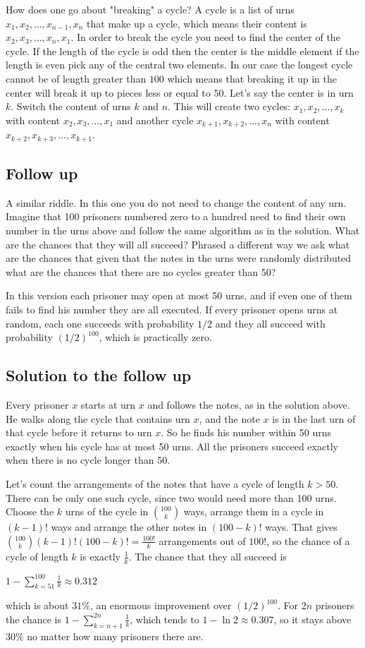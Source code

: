 How does one go about "breaking" a cycle? A cycle is a list of urns $x_1, x_2, \ldots,x_{n-1} ,x_n$ that make up a cycle, which means their content is $x_2, x_3, \ldots, x_n, x_1$. In order to break the cycle you need to find the center of the cycle. If the length of the cycle is odd then the center is the middle element if the length is even pick any of the central two elements. In our case the longest cycle cannot be of length greater than $100$ which means that breaking it up in the center will  break it up to pieces less or equal to 50. Let's say the center is in urn $k$. Switch the content of urns $k$ and $n$. This will create two cycles: $x_1, x_2, \ldots, x_k$ with content $x_2, x_3, \ldots, x_1$ and another cycle $x_{k+1}, x_{k+2}, \ldots, x_n$ with content $x_{k+2}, x_{k+3}, \ldots, x_{k+1}$.

\subsection{Follow up}
A similar riddle. In this one you do not need to change the content of any urn. Imagine that 100 prisoners numbered zero to a hundred need to find their own number in the urns above and follow the same algorithm as in the solution. What are the chances that they will all succeed? Phrased a different way we ask what are the chances that given that the notes in the urns were randomly distributed what are the chances that there are no cycles greater than 50?

In this version each prisoner may open at most 50 urns, and if even one of them fails to find his number they are all executed.
If every prisoner opens urns at random, each one succeeds with probability $1/2$ and they all succeed with probability $(1/2)^{100}$, which is practically zero.

\subsection{Solution to the follow up}
Every prisoner $x$ starts at urn $x$ and follows the notes, as in the solution above. He walks along the cycle that contains urn $x$, and the note $x$ is in the
last urn of that cycle before it returns to urn $x$. So he finds his number within 50 urns exactly when his cycle has at most 50 urns.
All the prisoners succeed exactly when there is no cycle longer than 50.

Let's count the arrangements of the notes that have a cycle of length $k > 50$. There can be only one such cycle, since two would need more than 100 urns.
Choose the $k$ urns of the cycle in $\binom{100}{k}$ ways, arrange them in a cycle in $(k-1)!$ ways and arrange the other notes in $(100-k)!$ ways.
That gives $\binom{100}{k}(k-1)!(100-k)! = \frac{100!}{k}$ arrangements out of $100!$, so the chance of a cycle of length $k$ is exactly $\frac{1}{k}$.
The chance that they all succeed is
\begin{center}
$1 - \sum_{k=51}^{100} \frac{1}{k} \approx 0.312$
\end{center}
which is about $31\%$, an enormous improvement over $(1/2)^{100}$.
For $2n$ prisoners the chance is $1 - \sum_{k=n+1}^{2n} \frac{1}{k}$, which tends to $1 - \ln 2 \approx 0.307$, so it stays above $30\%$ no matter how many prisoners there are.
